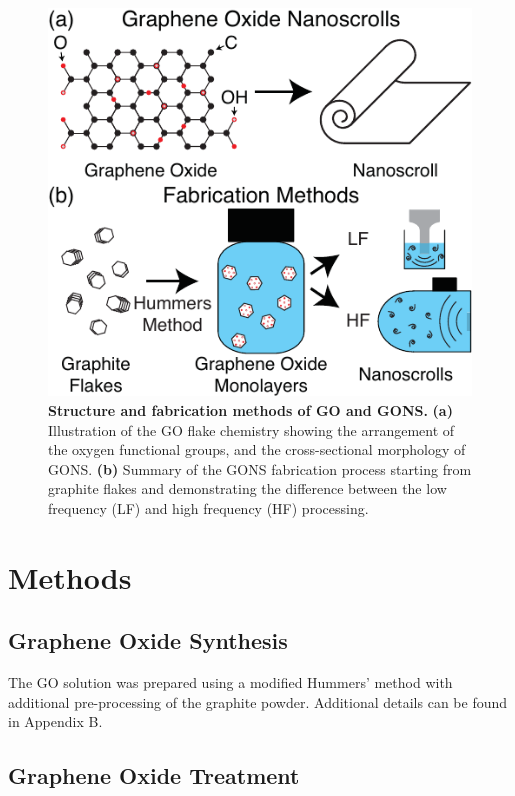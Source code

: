 \begin{figure}[t!]
  \centering
  \includegraphics{paper1/Fig1.pdf}
  \caption{\textbf{Structure and fabrication methods of GO and GONS.} \textbf{(a)} Illustration of the GO flake chemistry showing the arrangement of the oxygen functional groups, and the cross-sectional morphology of GONS. \textbf{(b)} Summary of the GONS fabrication process starting from graphite flakes and demonstrating the difference between the low frequency (LF) and high frequency (HF) processing.}
  \label{fig1}
\end{figure}


\section{Methods}

\subsection{Graphene Oxide Synthesis}

The GO solution was prepared using a modified Hummers' method\cite{Hummers1958} with additional pre-processing of the graphite powder.\cite{Kovtyukhova1999} Additional details can be found in Appendix B.

\subsection{Graphene Oxide Treatment}


